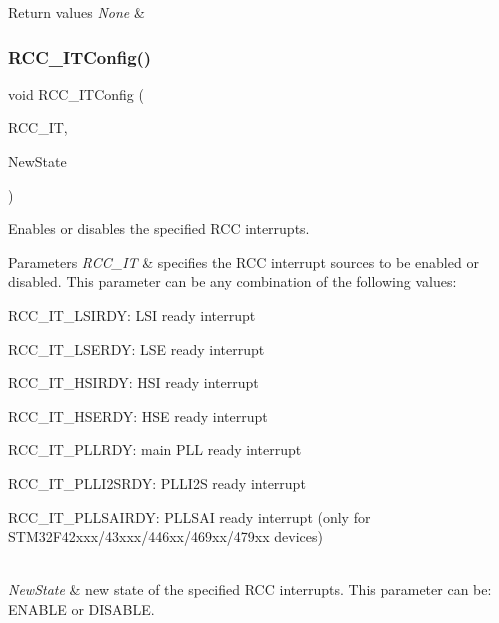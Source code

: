 \begin{DoxyRetVals}{Return values}
{\em None} & \\
\hline
\end{DoxyRetVals}
\mbox{\label{group___r_c_c_gaa953aa226e9ce45300d535941e4dfe2f}} 
\subsubsection{\texorpdfstring{R\+C\+C\+\_\+\+I\+T\+Config()}{RCC\_ITConfig()}}
{\footnotesize\ttfamily void R\+C\+C\+\_\+\+I\+T\+Config (\begin{DoxyParamCaption}\item[{uint8\+\_\+t}]{R\+C\+C\+\_\+\+IT,  }\item[{Functional\+State}]{New\+State }\end{DoxyParamCaption})}



Enables or disables the specified R\+CC interrupts. 


\begin{DoxyParams}{Parameters}
{\em R\+C\+C\+\_\+\+IT} & specifies the R\+CC interrupt sources to be enabled or disabled. This parameter can be any combination of the following values\+: \begin{DoxyItemize}
\item R\+C\+C\+\_\+\+I\+T\+\_\+\+L\+S\+I\+R\+DY\+: L\+SI ready interrupt \item R\+C\+C\+\_\+\+I\+T\+\_\+\+L\+S\+E\+R\+DY\+: L\+SE ready interrupt \item R\+C\+C\+\_\+\+I\+T\+\_\+\+H\+S\+I\+R\+DY\+: H\+SI ready interrupt \item R\+C\+C\+\_\+\+I\+T\+\_\+\+H\+S\+E\+R\+DY\+: H\+SE ready interrupt \item R\+C\+C\+\_\+\+I\+T\+\_\+\+P\+L\+L\+R\+DY\+: main P\+LL ready interrupt \item R\+C\+C\+\_\+\+I\+T\+\_\+\+P\+L\+L\+I2\+S\+R\+DY\+: P\+L\+L\+I2S ready interrupt \item R\+C\+C\+\_\+\+I\+T\+\_\+\+P\+L\+L\+S\+A\+I\+R\+DY\+: P\+L\+L\+S\+AI ready interrupt (only for S\+T\+M32\+F42xxx/43xxx/446xx/469xx/479xx devices) \end{DoxyItemize}
\\
\hline
{\em New\+State} & new state of the specified R\+CC interrupts. This parameter can be\+: E\+N\+A\+B\+LE or D\+I\+S\+A\+B\+LE. \\
\hline
\end{DoxyParams}

